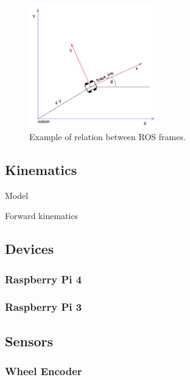 \begin{figure}[!ht]
\begin{center}
    \includegraphics[width=0.5\textwidth]{Images/2-Background/Frames-2021-04-22 12-03-22.png}
  \end{center}
  \caption{Example of relation between \Gls{ROS} frames.\cite{palsson_investigating_2017}}
  \label{fig:ros-frames}
\end{figure}
    


\subsection{Kinematics}
\label{ssec:dev}
\noindent 
Model

Forward kinematics

\subsection{Devices}
\label{ssec:dev}
\noindent 


\subsubsection{Raspberry Pi 4}
\noindent 


\subsubsection{Raspberry Pi 3}
\noindent 


\subsection{Sensors}
\label{ssec:sens}
\noindent 

\subsubsection{Wheel Encoder}
\noindent 

